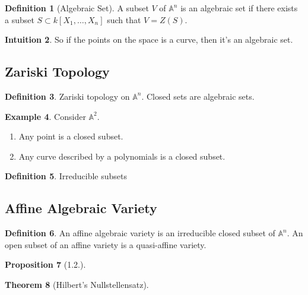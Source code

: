 \documentclass[11pt]{book}
\newtheorem{theorem}{Theorem}[section]
\newtheorem{proposition}[theorem]{Proposition}
\theoremstyle{definition}
\newtheorem{definition}[theorem]{Definition}
\newtheorem{example}[theorem]{Example}
\newtheorem{intuition}[theorem]{Intuition}
\numberwithin{equation}{section}
\begin{document}
\begin{defbox}
    \begin{definition}[Algebraic Set]
        \label{def:algebraic_set}
        A subset \(V\) of \(\mathbb{A}^n\) is an algebraic set if there exists a subset \(S \subset k[X_1, \ldots, X_n]\) such that \(V = Z(S)\).
    \end{definition}
\end{defbox}
\begin{intbox}
    \begin{intuition}
        So if the points on the space is a curve, then it's an algebraic set.
    \end{intuition}
\end{intbox}
\newpage
\subsection*{Zariski Topology}
\begin{defbox}
    \begin{definition}
        Zariski topology on \(\mathbb{A}^n\). Closed sets are algebraic sets.
    \end{definition}
\end{defbox}

\begin{example}
    Consider \(\mathbb{A}^2\).
    \begin{enumerate}
        \item Any point is a closed subset.
        \item Any curve described by a polynomials is a closed subset.
    \end{enumerate}
\end{example}

\begin{defbox}
    \begin{definition}
        Irreducible subsets
    \end{definition}
\end{defbox}
\newpage
\subsection*{Affine Algebraic Variety}

\begin{defbox}
    \begin{definition}
        \label{def:algebraic_variety}
        An affine algebraic variety is an irreducible closed subset of \(\mathbb{A}^n\). An open subset of an affine variety is a quasi-affine variety.
    \end{definition}
\end{defbox}
\begin{thmbox}
    \begin{proposition}[1.2.]
        
    \end{proposition}
\end{thmbox}
\begin{thmbox}
    \begin{theorem}[Hilbert's Nullstellensatz]
        
    \end{theorem}
\end{thmbox}
\end{document}
